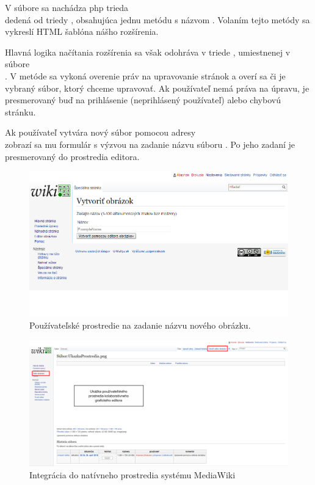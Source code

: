 V súbore  sa nachádza php trieda \\
 dedená od triedy , obsahujúca jednu metódu s názvom . Volaním tejto metódy sa vykreslí HTML šablóna nášho rozšírenia.

Hlavná logika načítania rozšírenia sa však odohráva v triede , umiestnenej v súbore \\
. V metóde  sa vykoná overenie práv na upravovanie stránok a overí sa či je vybraný súbor, ktorý chceme upravovať. Ak používateľ nemá práva na úpravu, je presmerovaný buď na prihlásenie (neprihlásený používateľ) alebo chybovú stránku.

Ak používateľ vytvára nový súbor pomocou adresy \\
 zobrazí sa mu formulár s výzvou na zadanie názvu súboru . Po jeho zadaní je presmerovaný do prostredia editora.

\begin{figure}[h]
	\centerline{\includegraphics[width=1\textwidth]{images/results/base-new}}
	\caption{Používateľské prostredie na zadanie názvu nového obrázku.}
	\label{obr:base-new}
\end{figure}
\FloatBarrier
\begin{figure}[h]
	\centerline{\includegraphics[width=1\textwidth]{images/results/base-integration}}
	\caption{Integrácia do natívneho prostredia systému MediaWiki}
\label{obr:base-integration}
\end{figure}
\FloatBarrier


